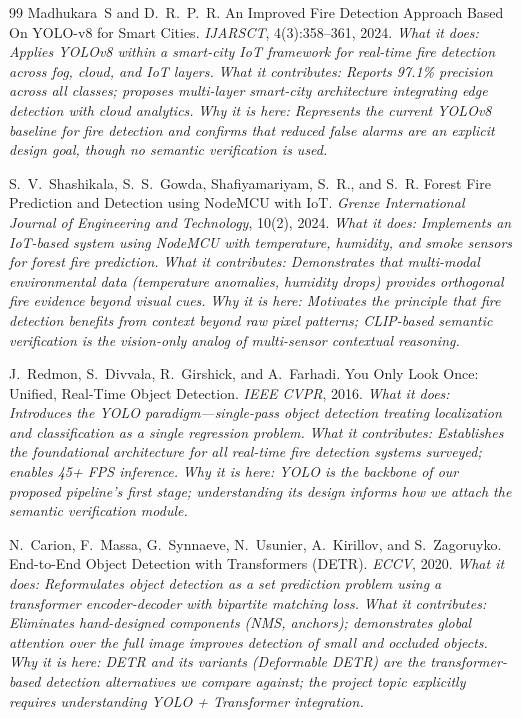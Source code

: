 \documentclass[11pt,twocolumn]{article}
\begin{document}
\begin{thebibliography}{99}
Madhukara~S and D.~R.~P.~R.
\newblock An Improved Fire Detection Approach Based On YOLO-v8 for Smart Cities.
\newblock \textit{IJARSCT}, 4(3):358--361, 2024.
\newblock \textit{What it does: Applies YOLOv8 within a smart-city IoT framework for real-time fire detection across fog, cloud, and IoT layers.}
\newblock \textit{What it contributes: Reports 97.1\% precision across all classes; proposes multi-layer smart-city architecture integrating edge detection with cloud analytics.}
\newblock \textit{Why it is here: Represents the current YOLOv8 baseline for fire detection and confirms that reduced false alarms are an explicit design goal, though no semantic verification is used.}

S.~V.~Shashikala, S.~S.~Gowda, Shafiyamariyam, S.~R., and S.~R.
\newblock Forest Fire Prediction and Detection using NodeMCU with IoT.
\newblock \textit{Grenze International Journal of Engineering and Technology}, 10(2), 2024.
\newblock \textit{What it does: Implements an IoT-based system using NodeMCU with temperature, humidity, and smoke sensors for forest fire prediction.}
\newblock \textit{What it contributes: Demonstrates that multi-modal environmental data (temperature anomalies, humidity drops) provides orthogonal fire evidence beyond visual cues.}
\newblock \textit{Why it is here: Motivates the principle that fire detection benefits from context beyond raw pixel patterns; CLIP-based semantic verification is the vision-only analog of multi-sensor contextual reasoning.}

J.~Redmon, S.~Divvala, R.~Girshick, and A.~Farhadi.
\newblock You Only Look Once: Unified, Real-Time Object Detection.
\newblock \textit{IEEE CVPR}, 2016.
\newblock \textit{What it does: Introduces the YOLO paradigm---single-pass object detection treating localization and classification as a single regression problem.}
\newblock \textit{What it contributes: Establishes the foundational architecture for all real-time fire detection systems surveyed; enables 45+ FPS inference.}
\newblock \textit{Why it is here: YOLO is the backbone of our proposed pipeline's first stage; understanding its design informs how we attach the semantic verification module.}

N.~Carion, F.~Massa, G.~Synnaeve, N.~Usunier, A.~Kirillov, and S.~Zagoruyko.
\newblock End-to-End Object Detection with Transformers (DETR).
\newblock \textit{ECCV}, 2020.
\newblock \textit{What it does: Reformulates object detection as a set prediction problem using a transformer encoder-decoder with bipartite matching loss.}
\newblock \textit{What it contributes: Eliminates hand-designed components (NMS, anchors); demonstrates global attention over the full image improves detection of small and occluded objects.}
\newblock \textit{Why it is here: DETR and its variants (Deformable DETR) are the transformer-based detection alternatives we compare against; the project topic explicitly requires understanding YOLO + Transformer integration.}


\end{thebibliography}
\end{document}

